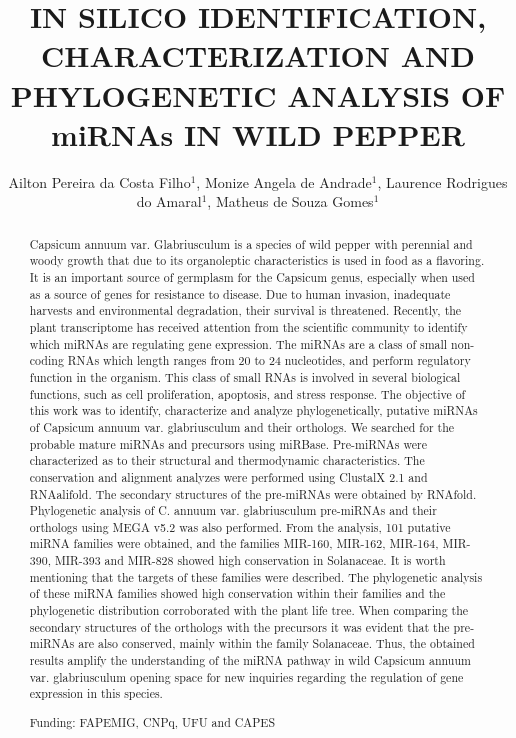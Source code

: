 \documentclass[twoside]{article}
\title{\vspace{-15mm}\fontsize{24pt}{10pt}\selectfont\textbf{IN SILICO IDENTIFICATION, CHARACTERIZATION AND PHYLOGENETIC ANALYSIS OF miRNAs IN WILD PEPPER}} %
\author{Ailton Pereira da Costa Filho$^1$, Monize Angela de Andrade$^1$, Laurence Rodrigues do Amaral$^1$, Matheus de Souza Gomes$^1$}
\affil{1 UFU\\ }
\date{}
\begin{document}
\maketitle %

\thispagestyle{fancy} %


\begin{abstract}
Capsicum annuum var. Glabriusculum is a species of wild pepper with perennial and woody growth that due to its organoleptic characteristics is used in food as a flavoring. It is an important source of germplasm for the Capsicum genus, especially when used as a source of genes for resistance to disease. Due to human invasion, inadequate harvests and environmental degradation, their survival is threatened. Recently, the plant transcriptome has received attention from the scientific community to identify which miRNAs are regulating gene expression. The miRNAs are a class of small non-coding RNAs which length ranges from 20 to 24 nucleotides, and perform regulatory function in the organism. This class of small RNAs is involved in several biological functions, such as cell proliferation, apoptosis, and stress response. The objective of this work was to identify, characterize and analyze phylogenetically, putative miRNAs of Capsicum annuum var. glabriusculum and their orthologs. We searched for the probable mature miRNAs and precursors using miRBase. Pre-miRNAs were characterized as to their structural and thermodynamic characteristics. The conservation and alignment analyzes were performed using ClustalX 2.1 and RNAalifold. The secondary structures of the pre-miRNAs were obtained by RNAfold. Phylogenetic analysis of C. annuum var. glabriusculum pre-miRNAs and their orthologs using MEGA v5.2 was also performed. From the analysis, 101 putative miRNA families were obtained, and the families MIR-160, MIR-162, MIR-164, MIR-390, MIR-393 and MIR-828 showed high conservation in Solanaceae. It is worth mentioning that the targets of these families were described. The phylogenetic analysis of these miRNA families showed high conservation within their families and the phylogenetic distribution corroborated with the plant life tree. When comparing the secondary structures of the orthologs with the precursors it was evident that the pre-miRNAs are also conserved, mainly within the family Solanaceae. Thus, the obtained results amplify the understanding of the miRNA pathway in wild Capsicum annuum var. glabriusculum opening space for new inquiries regarding the regulation of gene expression in this species.

Funding: FAPEMIG, CNPq, UFU and CAPES
\end{abstract}
\end{document}
